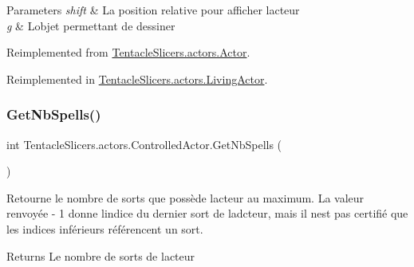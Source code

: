 \begin{DoxyParams}{Parameters}
{\em shift} & La position relative pour afficher l\textquotesingle{}acteur \\
\hline
{\em g} & L\textquotesingle{}objet permettant de dessiner \\
\hline
\end{DoxyParams}


Reimplemented from \hyperlink{class_tentacle_slicers_1_1actors_1_1_actor_ae06facc411c8cd44596e59020d131dd7}{Tentacle\+Slicers.\+actors.\+Actor}.



Reimplemented in \hyperlink{class_tentacle_slicers_1_1actors_1_1_living_actor_a9b8adc982e25895a4509c870f784b5f1}{Tentacle\+Slicers.\+actors.\+Living\+Actor}.

\mbox{\label{class_tentacle_slicers_1_1actors_1_1_controlled_actor_aa98186daa9934f26ffa8a1cb06b1cbc8}} 
\subsubsection{\texorpdfstring{Get\+Nb\+Spells()}{GetNbSpells()}}
{\footnotesize\ttfamily int Tentacle\+Slicers.\+actors.\+Controlled\+Actor.\+Get\+Nb\+Spells (\begin{DoxyParamCaption}{ }\end{DoxyParamCaption})}



Retourne le nombre de sorts que possède l\textquotesingle{}acteur au maximum. La valeur renvoyée -\/ 1 donne l\textquotesingle{}indice du dernier sort de l\textquotesingle{}adcteur, mais il n\textquotesingle{}est pas certifié que les indices inférieurs référencent un sort. 

\begin{DoxyReturn}{Returns}
Le nombre de sorts de l\textquotesingle{}acteur 
\end{DoxyReturn}
\mbox{\label{class_tentacle_slicers_1_1actors_1_1_controlled_actor_ad5f70ea26f58c0fe2145066c9afcc4de}} 

